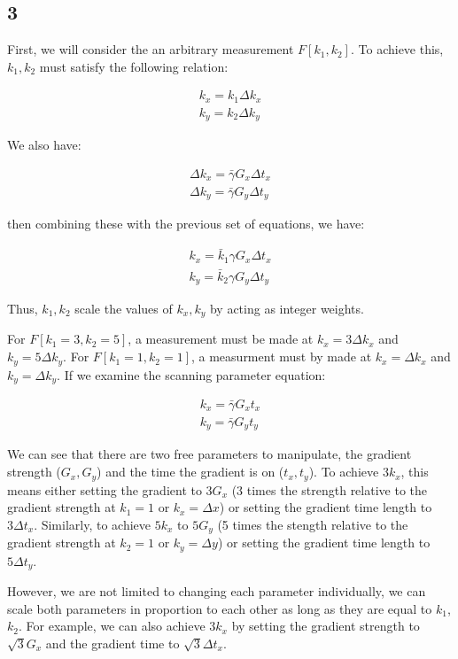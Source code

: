 \documentclass{article}
\begin{document}
\subsection*{3}
First, we will consider the an arbitrary measurement $F[k_1, k_2]$. To achieve this, $k_1, k_2$ must satisfy the
following relation:

\begin{align*}
    k_x = k_1 \Delta k_x \\
    k_y = k_2 \Delta k_y
\end{align*}

We also have:

\begin{align*}
    \Delta k_x = \bar{\gamma}G_{x} \Delta t_x \\
    \Delta k_y = \bar{\gamma}G_{y} \Delta t_y
\end{align*}

then combining these with the previous set of equations, we have:

\begin{align*}
    k_x = \bar k_1 {\gamma}G_{x} \Delta t_x \\
    k_y = \bar k_2 {\gamma}G_{y} \Delta t_y
\end{align*}

Thus, $k_1, k_2$ scale the values of $k_x, k_y$ by acting as integer weights.

For $F[k_1 = 3, k_2 = 5]$, a measurement must be made at $k_x = 3 \Delta k_x$ and $k_y = 5 \Delta k_y$. For
$F[k_1 = 1, k_2 = 1]$, a measurment must by made at $k_x = \Delta k_x$ and $k_y = \Delta k_y$. If we examine the
scanning parameter equation:

\begin{align*}
    k_x = \bar {\gamma}G_{x} t_x \\
    k_y = \bar {\gamma}G_{y} t_y
\end{align*}

We can see that there are two free parameters to manipulate, the gradient strength ($G_x, G_y$) and the time the
gradient is on ($t_x, t_y$). To achieve $3k_x$, this means either setting the gradient to $3G_x$ (3 times the strength
relative to the gradient strength at $k_1 = 1$ or $k_x = \Delta x$) or setting the gradient time length to
$3\Delta t_x$. Similarly, to achieve $5k_x$ to $5G_y$ (5 times the stength relative to the gradient strength at
$k_2 = 1$ or $k_y = \Delta y$) or setting the gradient time length to $5 \Delta t_y$.

However, we are not limited to changing each parameter individually, we can scale both parameters in proportion to
each other as long as they are equal to $k_1$, $k_2$. For example, we can also achieve $3k_x$ by setting the
gradient strength to $\sqrt{3}G_x$ and the gradient time to $\sqrt{3}\Delta t_x$.
\end{document}
